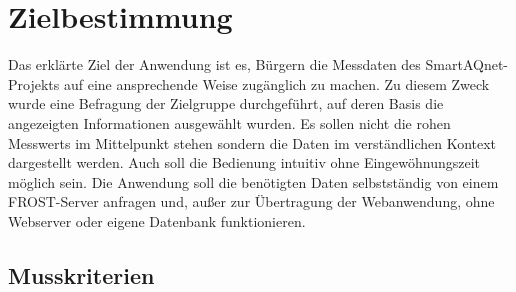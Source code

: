 \section{Zielbestimmung}
Das erklärte Ziel der Anwendung ist es, Bürgern die Messdaten des \gls{SmartAQnet}-Projekts auf eine ansprechende Weise zugänglich zu machen.
Zu diesem Zweck wurde eine Befragung der Zielgruppe durchgeführt, auf deren Basis die angezeigten Informationen ausgewählt wurden.
Es sollen nicht die rohen \glspl{Messwert} im Mittelpunkt stehen sondern die Daten im verständlichen Kontext dargestellt werden.
Auch soll die Bedienung intuitiv ohne Eingewöhnungszeit möglich sein.
Die Anwendung soll die benötigten Daten selbstständig von einem \gls{FROST-Server} anfragen und, außer zur Übertragung der \gls{Webanwendung}, ohne \gls{Webserver} oder eigene Datenbank funktionieren.

\subsection{Musskriterien}
\setcounter{counter}{10}

